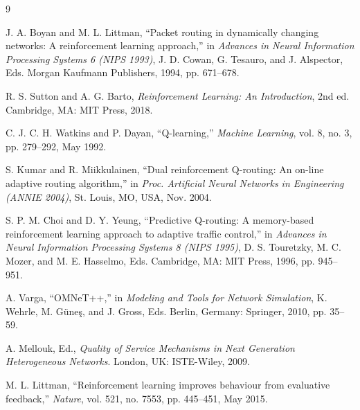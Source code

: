 \documentclass[12pt,a4paper]{article}
\begin{document}
\begin{thebibliography}{9}

J. A. Boyan and M. L. Littman, 
``Packet routing in dynamically changing networks: A reinforcement learning approach,''
in \textit{Advances in Neural Information Processing Systems 6 (NIPS 1993)}, 
J. D. Cowan, G. Tesauro, and J. Alspector, Eds. 
Morgan Kaufmann Publishers, 1994, pp. 671--678.

R. S. Sutton and A. G. Barto,
\textit{Reinforcement Learning: An Introduction}, 2nd ed.
Cambridge, MA: MIT Press, 2018.

C. J. C. H. Watkins and P. Dayan,
``Q-learning,''
\textit{Machine Learning}, vol. 8, no. 3, pp. 279--292, May 1992.

S. Kumar and R. Miikkulainen,
``Dual reinforcement Q-routing: An on-line adaptive routing algorithm,''
in \textit{Proc. Artificial Neural Networks in Engineering (ANNIE 2004)},
St. Louis, MO, USA, Nov. 2004.

S. P. M. Choi and D. Y. Yeung,
``Predictive Q-routing: A memory-based reinforcement learning approach to adaptive traffic control,''
in \textit{Advances in Neural Information Processing Systems 8 (NIPS 1995)},
D. S. Touretzky, M. C. Mozer, and M. E. Hasselmo, Eds.
Cambridge, MA: MIT Press, 1996, pp. 945--951.

A. Varga,
``OMNeT++,''
in \textit{Modeling and Tools for Network Simulation},
K. Wehrle, M. G{\"u}ne{\c{s}}, and J. Gross, Eds.
Berlin, Germany: Springer, 2010, pp. 35--59.

A. Mellouk, Ed.,
\textit{Quality of Service Mechanisms in Next Generation Heterogeneous Networks}.
London, UK: ISTE-Wiley, 2009.

M. L. Littman,
``Reinforcement learning improves behaviour from evaluative feedback,''
\textit{Nature}, vol. 521, no. 7553, pp. 445--451, May 2015.

\end{thebibliography}
\end{document}
